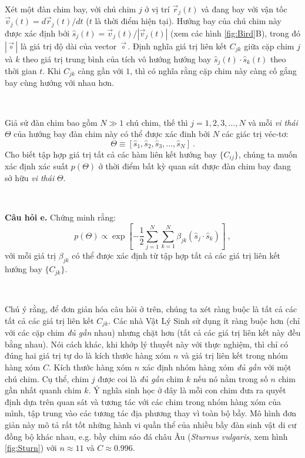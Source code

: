 \ \  

Xét một đàn chim bay, với chú chim $j$ ở vị trí $\vec{r}_j(t)$ và đang bay với vận tốc $\vec{v}_j(t)=d\vec{r}_j(t)/dt$ ($t$ là thời điểm hiện tại). Hướng bay của chú chim này được xác định bởi
$\hat{s}_j(t) = \vec{v}_j(t)/\left| \vec{v}_j(t)\right|$ (xem các hình \ref{fig:Bird}B), trong đó $\left|\vec{\circ}\right|$ là giá trị độ dài của vector $\vec{\circ}$. Định nghĩa giá trị liên kết $C_{jk}$ giữa cặp chim $j$ và $k$ theo giá trị trung bình của tích vô hướng hướng bay $\hat{s}_j(t) \cdot \hat{s}_k(t)$ theo thời gian $t$. Khi $C_{jk}$ càng gần với $1$, thì có nghĩa rằng cặp chim này càng cố gắng bay cùng hướng với nhau hơn.

\ \ 

Giả sử đàn chim bao gồm $N\gg 1$ chú chim, thế thì $j=1,2,3,...,N$ và mỗi \textit{vi thái} $\Theta$ của hướng bay đàn chim này có thể được xác đinh bởi $N$ các giác trị véc-tơ:
$$ \Theta \equiv \left[ \hat{s}_1, \hat{s}_2, \hat{s}_3, ..., \hat{s}_N \right] \ .$$
Cho biết tập hợp giá trị tất cả các hàm liên kết hướng bay $\{ C_{ij} \}$, chúng ta muốn xác định xác suất $p(\Theta)$ ở thời điểm bất kỳ quan sát được đàn chim bay đang sở hữu \textit{vi thái} $\Theta$.

\ \ 

\textbf{Câu hỏi e.} Chứng minh rằng:
\begin{equation}
    p(\Theta) \propto \exp\left[ -\frac12 \sum^N_{j=1} \sum^N_{k=1} \beta_{jk} \left(\hat{s}_j \cdot \hat{s}_k \right) \right] \ ,
\end{equation}
với mỗi giá trị $\beta_{jk}$ có thể được xác định từ tập hợp tất cả các giá trị liên kết hướng bay $\{ C_{jk}\}$.

\ \ 

Chú ý rằng, để đơn giản hóa câu hỏi ở trên, chúng ta xét ràng buộc là tất cả các tất cả các giá trị liên kết $C_{jk}$. Các nhà Vật Lý Sinh sử dụng ít ràng buộc hơn (chỉ với các cặp chim \textit{đủ gần} nhau) nhưng chặt hơn (tất cả các giá trị liên kết này đều bằng nhau). Nói cách khác, khi khớp lý thuyết này với thực nghiệm, thì chỉ có đúng hai giá trị tự do là kích thước hàng xóm $n$ và giá trị liên kết trong nhóm hàng xóm $C$. Kích thước hàng xóm $n$ xác định nhóm hàng xóm \textit{đủ gần} với một chú chim. Cụ thể, chim $j$ được coi là \textit{đủ gần} chim $k$ nếu nó nằm trong số $n$ chim gần nhất quanh chim $k$. Ý nghĩa sinh học ở đây là mỗi con chim đưa ra quyết định dựa trên quan sát và tương tác với các chim trong nhóm hàng xóm của mình, tập trung vào các tương tác địa phương thay vì toàn bộ bầy. Mô hình đơn giản này mô tả rất tốt những hành vi quần thể của nhiều bầy đàn sinh vật di cư đồng bộ khác nhau, e.g. bầy chim sáo đá châu Âu (\textit{Sturnus vulgaris}, xem hình \ref{fig:Sturn}) với $n\approx 11$ và $C\approx 0.996$. 

